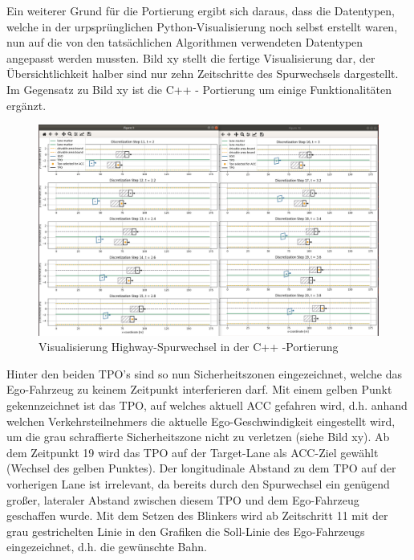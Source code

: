 
Ein weiterer Grund für die Portierung ergibt sich daraus, dass die Datentypen, welche in der urpsprünglichen Python-Visualisierung noch selbst erstellt waren, nun auf die von den tatsächlichen Algorithmen verwendeten Datentypen angepasst werden mussten. Bild xy stellt die fertige Visualisierung dar, der Übersichtlichkeit halber sind nur zehn Zeitschritte des Spurwechsels dargestellt. Im Gegensatz zu Bild xy ist die C++ - Portierung um einige Funktionalitäten ergänzt.

\begin{figure}[!ht]
	\begin{center}
		\includegraphics[width=1.0\linewidth]{Abbildungen/bericht/unittest_lc_visu_clion_part1}
		\caption{Visualisierung Highway-Spurwechsel in der C++ -Portierung}
		\label{fig.highway_spurwechsel_clion}
	\end{center}
\end{figure} 

Hinter den beiden TPO's sind so nun Sicherheitszonen eingezeichnet, welche das Ego-Fahrzeug zu keinem Zeitpunkt interferieren darf. Mit einem gelben Punkt gekennzeichnet ist das TPO, auf welches aktuell ACC gefahren wird, d.h. anhand welchen Verkehrsteilnehmers die aktuelle Ego-Geschwindigkeit eingestellt wird, um die grau schraffierte Sicherheitszone nicht zu verletzen (siehe Bild xy). Ab dem Zeitpunkt 19  wird das TPO auf der Target-Lane als ACC-Ziel gewählt (Wechsel des gelben Punktes). Der longitudinale Abstand zu dem TPO auf der vorherigen Lane ist irrelevant, da bereits durch den Spurwechsel ein genügend großer, lateraler Abstand zwischen diesem TPO und dem Ego-Fahrzeug geschaffen wurde. Mit dem Setzen des Blinkers wird ab Zeitschritt 11 mit der grau gestrichelten Linie in den Grafiken die Soll-Linie des Ego-Fahrzeugs eingezeichnet, d.h. die gewünschte Bahn.

